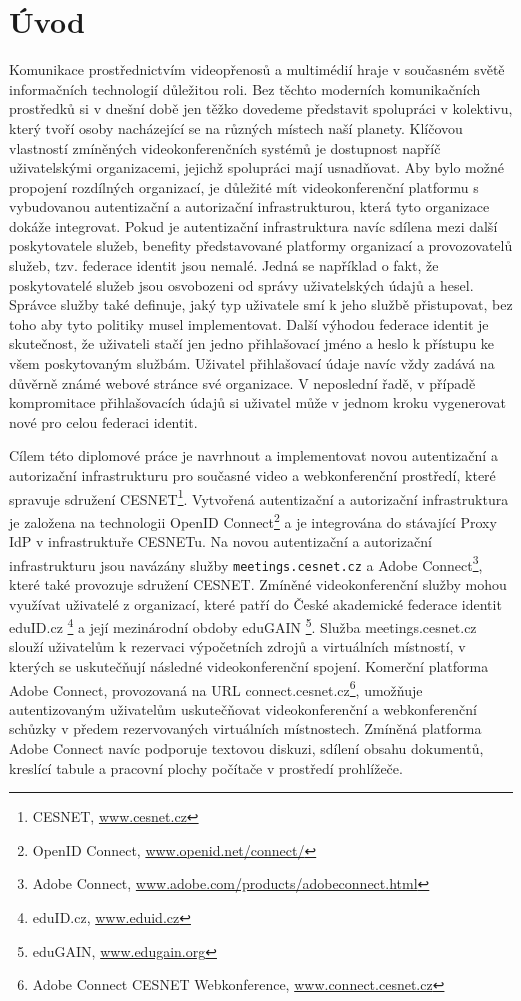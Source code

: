 \documentclass[
  printed, %
  twoside, %
  table,   %
  nolof,     %
  nolot,     %
]{fithesis3}
\begin{document}
\chapter{Úvod}
Komunikace prostřednictvím videopřenosů a multimédií hraje v současném světě informačních technologií důležitou roli. Bez těchto moderních komunikačních prostředků si v dnešní době jen těžko dovedeme představit spolupráci v kolektivu, který tvoří osoby nacházející se na různých místech naší planety. Klíčovou vlastností zmíněných videokonferenčních systémů je dostupnost napříč uživatelskými organizacemi, jejichž spolupráci mají usnadňovat. Aby bylo možné propojení rozdílných organizací, je důležité mít videokonferenční platformu s vybudovanou autentizační a autorizační infrastrukturou, která tyto organizace dokáže integrovat. Pokud je autentizační infrastruktura navíc sdílena mezi další poskytovatele služeb, benefity představované platformy organizací a provozovatelů služeb, tzv. federace identit jsou nemalé. Jedná se například o fakt, že poskytovatelé služeb jsou osvobozeni od správy uživatelských údajů a hesel. Správce služby také definuje, jaký typ uživatele smí k jeho službě přistupovat, bez toho aby tyto politiky musel implementovat. Další výhodou federace identit je skutečnost, že uživateli stačí jen jedno přihlašovací jméno a heslo k přístupu ke všem poskytovaným službám. Uživatel přihlašovací údaje navíc vždy zadává na důvěrně známé webové stránce své organizace. V neposlední řadě, v případě kompromitace  přihlašovacích údajů si uživatel může v jednom kroku vygenerovat nové pro celou federaci identit. 

Cílem této diplomové práce je navrhnout a implementovat novou autentizační a autorizační infrastrukturu pro současné video a webkonferenční prostředí, které spravuje sdružení CESNET\footnote{CESNET, \url{www.cesnet.cz}}. Vytvořená autentizační a autorizační infrastruktura je založena na technologii OpenID Connect\footnote{OpenID Connect, \url{www.openid.net/connect/}}  a je integrována do stávající Proxy IdP v infrastruktuře CESNETu. Na novou autentizační a autorizační infrastrukturu jsou navázány služby \texttt{meetings.cesnet.cz} a Adobe Connect\footnote{Adobe Connect, \url{www.adobe.com/products/adobeconnect.html}}, které také provozuje sdružení CESNET. Zmíněné videokonferenční služby mohou využívat uživatelé z organizací, které patří do České akademické federace identit eduID.cz \footnote{eduID.cz, \url{www.eduid.cz}} a její mezinárodní obdoby eduGAIN \footnote{eduGAIN, \url{www.edugain.org}}. Služba meetings.cesnet.cz slouží uživatelům k rezervaci výpočetních zdrojů a virtuálních místností, v kterých se uskutečňují následné videokonferenční spojení. Komerční platforma Adobe Connect, provozovaná na URL connect.cesnet.cz\footnote{Adobe Connect CESNET Webkonference, \url{www.connect.cesnet.cz}}, umožňuje autentizovaným uživatelům uskutečňovat videokonferenční a webkonferenční schůzky v předem rezervovaných virtuálních místnostech. Zmíněná platforma Adobe Connect navíc podporuje textovou diskuzi, sdílení obsahu dokumentů, kreslící tabule a pracovní plochy počítače v prostředí prohlížeče. 
\end{document}
